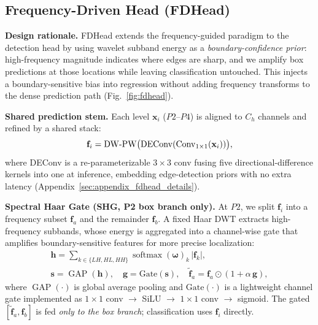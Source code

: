 \documentclass{article}
\theoremstyle{plain}
\theoremstyle{definition}
\theoremstyle{remark}
\begin{document}
 \subsection{Frequency-Driven Head (FDHead)}
 

 
\noindent\textbf{Design rationale.}  
FDHead extends the frequency-guided paradigm to the detection head by using wavelet subband energy as a \emph{boundary-confidence prior}: high-frequency magnitude indicates where edges are sharp, and we amplify box predictions at those locations while leaving classification untouched. This injects a boundary-sensitive bias into regression without adding frequency transforms to the dense prediction path (Fig.~\ref{fig:fdhead}).

\noindent\textbf{Shared prediction stem.}
Each level $\mathbf{x}_i$ ($P2$--$P4$) is aligned to $C_h$ channels and refined by a shared stack:
\vspace{-0.2cm}
\begin{equation}
\mathbf{f}_i = \mathrm{DW{\text -}PW}\bigl(\mathrm{DEConv}(\mathrm{Conv}_{1{\times}1}(\mathbf{x}_i))\bigr),
\vspace{-0.2cm}
\end{equation}
where DEConv is a re-parameterizable $3{\times}3$ conv fusing five directional-difference kernels into one at inference, embedding edge-detection priors with no extra latency (Appendix~\ref{sec:appendix_fdhead_details}).

\noindent\textbf{Spectral Haar Gate (SHG, P2 box branch only).}
At $P2$, we split $\mathbf{f}_i$ into a frequency subset $\mathbf{f}_a$ and the remainder $\mathbf{f}_b$. A fixed Haar DWT extracts high-frequency subbands, whose energy is aggregated into a channel-wise gate that amplifies boundary-sensitive features for more precise localization:
\begin{equation}
\label{eq:fdhead_hfgate}
\begin{gathered}
\mathbf{h} = \textstyle\sum_{k\in\{LH,HL,HH\}} \operatorname{softmax}(\boldsymbol{\omega})_k\,|\mathbf{f}_k|,\\
\mathbf{s} = \operatorname{GAP}(\mathbf{h}),\quad \mathbf{g} = \mathrm{Gate}(\mathbf{s}),\quad
\widetilde{\mathbf{f}}_a = \mathbf{f}_a\odot(1+\alpha\,\mathbf{g}),
\end{gathered}
\end{equation}
where $\operatorname{GAP}(\cdot)$ is global average pooling and $\mathrm{Gate}(\cdot)$ is a lightweight channel gate implemented as $1\times 1$ conv $\rightarrow$ SiLU $\rightarrow$ $1\times 1$ conv $\rightarrow$ sigmoid. The gated $[\widetilde{\mathbf{f}}_a,\mathbf{f}_b]$ is fed \emph{only to the box branch}; classification uses $\mathbf{f}_i$ directly.
\end{document}
